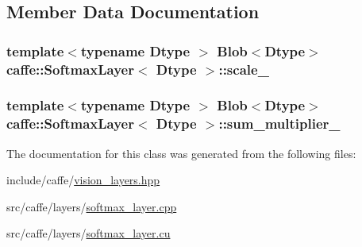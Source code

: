 \subsection{Member Data Documentation}
\hypertarget{classcaffe_1_1_softmax_layer_a22a5348d7a31c512ac9d5dcfc066d4b1}{
\subsubsection[{scale\+\_\+}]{\setlength{\rightskip}{0pt plus 5cm}template$<$typename Dtype $>$ {\bf Blob}$<$Dtype$>$ {\bf caffe\+::\+Softmax\+Layer}$<$ Dtype $>$\+::scale\+\_\+\hspace{0.3cm}{\ttfamily [protected]}}}\label{classcaffe_1_1_softmax_layer_a22a5348d7a31c512ac9d5dcfc066d4b1}
\hypertarget{classcaffe_1_1_softmax_layer_a3bfc4000b464ab32c73060a2d5c4e426}{
\subsubsection[{sum\+\_\+multiplier\+\_\+}]{\setlength{\rightskip}{0pt plus 5cm}template$<$typename Dtype $>$ {\bf Blob}$<$Dtype$>$ {\bf caffe\+::\+Softmax\+Layer}$<$ Dtype $>$\+::sum\+\_\+multiplier\+\_\+\hspace{0.3cm}{\ttfamily [protected]}}}\label{classcaffe_1_1_softmax_layer_a3bfc4000b464ab32c73060a2d5c4e426}


The documentation for this class was generated from the following files\+:\begin{DoxyCompactItemize}
\item 
include/caffe/\hyperlink{vision__layers_8hpp}{vision\+\_\+layers.\+hpp}\item 
src/caffe/layers/\hyperlink{softmax__layer_8cpp}{softmax\+\_\+layer.\+cpp}\item 
src/caffe/layers/\hyperlink{softmax__layer_8cu}{softmax\+\_\+layer.\+cu}\end{DoxyCompactItemize}
